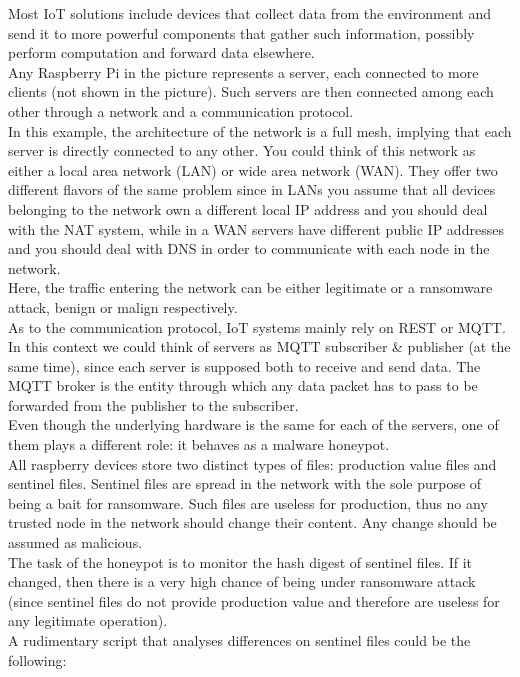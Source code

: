 \noindent Most IoT solutions include devices that collect data from the environment and send it to more powerful components that gather such information, possibly perform computation and forward data elsewhere.\\
Any Raspberry Pi in the picture represents a server, each connected to more clients (not shown in the picture). Such servers are then connected among each other through a network and a communication protocol.\\
In this example, the architecture of the network is a full mesh, implying that each server is directly connected to any other. You could think of this network as either a local area network (LAN) or wide area network (WAN). They offer two different flavors of the same problem since in LANs you assume that all devices belonging to the network own a different local IP address and you should deal with the NAT system, while in a WAN servers have different public IP addresses and you should deal with DNS in order to communicate with each node in the network. \\ 
Here, the traffic entering the network can be either legitimate or a ransomware attack, benign or malign respectively.\\
As to the communication protocol, IoT systems mainly rely on REST or MQTT. In this context we could think of servers as MQTT subscriber \& publisher (at the same time), since each server is supposed both to receive and send data. The MQTT broker is the entity through which any data packet has to pass to be forwarded from the publisher to the subscriber.\\
Even though the underlying hardware is the same for each of the servers, one of them plays a different role: it behaves as a malware honeypot.\\
All raspberry devices store two distinct types of files: production value files and sentinel files.
Sentinel files are spread in the network with the sole purpose of being a bait for ransomware. Such files are useless for production, thus no any trusted node in the network should change their content. Any change should be assumed as malicious.\\
The task of the honeypot is to monitor the hash digest of sentinel files. If it changed, then there is a very high chance of being under ransomware attack (since sentinel files do not provide production value and therefore are useless for any legitimate operation).\\
A rudimentary script that analyses differences on sentinel files could be the following:\\
